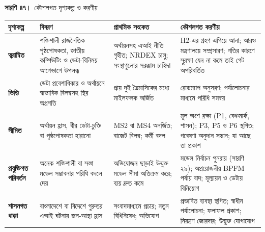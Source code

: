 \documentclass[border=10pt]{standalone}
\begin{document}
\begin{minipage}{17cm}
{\large\bfseries সারণি ৪৭।}\ {\large কৌশলগত দৃশ্যকল্প ও করণীয়}\par\vspace{7pt}
\small
{}
\begin{tabularx}{\linewidth}{@{}>{\hsize=0.681\hsize\raggedright\arraybackslash}X>{\hsize=1.106\hsize\raggedright\arraybackslash}X>{\hsize=0.979\hsize\raggedright\arraybackslash}X>{\hsize=1.234\hsize\raggedright\arraybackslash}X@{}}
\arrayrulecolor{bapilrule}\toprule
\rowcolor{white}\textbf{দৃশ্যকল্প} & \textbf{বিবরণ} & \textbf{প্রাথমিক সংকেত} & \textbf{কৌশলগত করণীয়} \\
\midrule
\textbf{ত্বরান্বিত} & শক্তিশালী রাজনৈতিক পৃষ্ঠপোষকতা, জাতীয় কম্পিউটিং ও ডেটা-বিনিময় আগেভাগে উপলব্ধ & অর্থায়নসহ এআই নীতি গৃহীত; NRDEX চালু; সংস্থাগুলোর সরঞ্জাম চাহিদা & H2-এর গ্রহণ এগিয়ে আনা; আরও মন্ত্রণালয়ে সম্প্রসারণ; গতির কারণে সুরক্ষা যেন না কমে তাই গেট অপরিবর্তিত \\
\textbf{ভিত্তি} & ডেটা প্রবেশাধিকার ও অর্থায়নে স্বাভাবিক বিলম্বসহ স্থির অগ্রগতি & প্রায় দুই ত্রৈমাসিকের মধ্যে মাইলফলক অর্জিত & রোডম্যাপ অনুসরণ; পর্যালোচনার মাধ্যমে পরিধি সমন্বয় \\
\textbf{সীমিত} & অর্থায়ন হ্রাস, ধীর ডেটা-চুক্তি বা পৃষ্ঠপোষকতা হারানো & MS2 বা MS4 অনর্জিত; বাজেট বিলম্ব; কর্মী বদল & মূল অংশ রক্ষা (P1, বেঞ্চমার্ক, শাসন); P3, P5 ও P6 স্থগিত; গবেষণা অনুদান সন্ধান; যা আছে তা প্রকাশ \\
\textbf{প্রযুক্তিগত পরিবর্তন} & অনেক শক্তিশালী বা সস্তা মডেল সম্ভাবনার পরিধি বদলে দেয় & অভিযোজন ছাড়াই উন্মুক্ত মডেল সীমা অতিক্রম করে; ব্যয় দ্রুত কমে & মডেল নির্বাচন পুনরায় (সারণি ২৯); অপ্রয়োজনীয় BPFM পর্যায় বাদ; মূল্যায়ন ও ডেটায় বিনিয়োগ \\
\textbf{শাসনগত ধাক্কা} & বাংলাদেশে বা বিদেশে গুরুতর এআই ঘটনায় জন-আস্থা হ্রাস & সংবাদমাধ্যমে প্রচার; নতুন বিধিনিষেধ; অভিযোগ & প্রভাবিত ব্যবস্থা স্থগিত; স্বাধীন পর্যালোচনা; ফলাফল প্রকাশ; নিয়ন্ত্রণ জোরদার; উন্মুক্ত যোগাযোগ \\
\bottomrule
\end{tabularx}
\par{}
\end{minipage}
\end{document}
